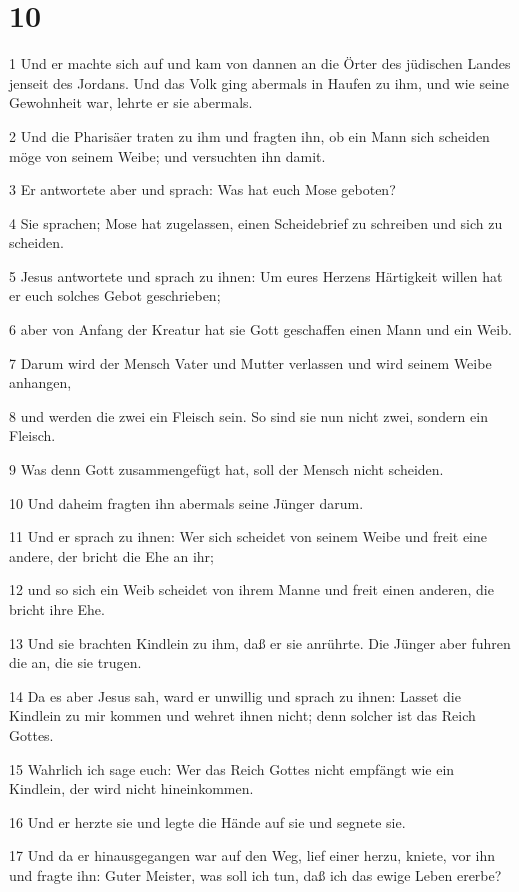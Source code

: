 \chapter{10}

\par 1 Und er machte sich auf und kam von dannen an die Örter des jüdischen Landes jenseit des Jordans. Und das Volk ging abermals in Haufen zu ihm, und wie seine Gewohnheit war, lehrte er sie abermals.
\par 2 Und die Pharisäer traten zu ihm und fragten ihn, ob ein Mann sich scheiden möge von seinem Weibe; und versuchten ihn damit.
\par 3 Er antwortete aber und sprach: Was hat euch Mose geboten?
\par 4 Sie sprachen; Mose hat zugelassen, einen Scheidebrief zu schreiben und sich zu scheiden.
\par 5 Jesus antwortete und sprach zu ihnen: Um eures Herzens Härtigkeit willen hat er euch solches Gebot geschrieben;
\par 6 aber von Anfang der Kreatur hat sie Gott geschaffen einen Mann und ein Weib.
\par 7 Darum wird der Mensch Vater und Mutter verlassen und wird seinem Weibe anhangen,
\par 8 und werden die zwei ein Fleisch sein. So sind sie nun nicht zwei, sondern ein Fleisch.
\par 9 Was denn Gott zusammengefügt hat, soll der Mensch nicht scheiden.
\par 10 Und daheim fragten ihn abermals seine Jünger darum.
\par 11 Und er sprach zu ihnen: Wer sich scheidet von seinem Weibe und freit eine andere, der bricht die Ehe an ihr;
\par 12 und so sich ein Weib scheidet von ihrem Manne und freit einen anderen, die bricht ihre Ehe.
\par 13 Und sie brachten Kindlein zu ihm, daß er sie anrührte. Die Jünger aber fuhren die an, die sie trugen.
\par 14 Da es aber Jesus sah, ward er unwillig und sprach zu ihnen: Lasset die Kindlein zu mir kommen und wehret ihnen nicht; denn solcher ist das Reich Gottes.
\par 15 Wahrlich ich sage euch: Wer das Reich Gottes nicht empfängt wie ein Kindlein, der wird nicht hineinkommen.
\par 16 Und er herzte sie und legte die Hände auf sie und segnete sie.
\par 17 Und da er hinausgegangen war auf den Weg, lief einer herzu, kniete, vor ihn und fragte ihn: Guter Meister, was soll ich tun, daß ich das ewige Leben ererbe?
